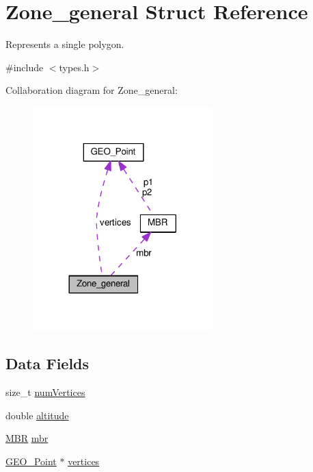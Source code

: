 \hypertarget{struct_zone__general}{}\section{Zone\+\_\+general Struct Reference}
\label{struct_zone__general}


Represents a single polygon.  




{\ttfamily \#include $<$types.\+h$>$}



Collaboration diagram for Zone\+\_\+general\+:\nopagebreak
\begin{figure}[H]
\begin{center}
\leavevmode
\includegraphics[width=197pt]{struct_zone__general__coll__graph}
\end{center}
\end{figure}
\subsection*{Data Fields}
\begin{DoxyCompactItemize}
\item 
size\+\_\+t \hyperlink{struct_zone__general_a4201b99044782c4891e04f4981f402e9}{num\+Vertices}
\item 
double \hyperlink{struct_zone__general_a2b13d276aee0d9fd646c8fa3647e869b}{altitude}
\item 
\hyperlink{struct_m_b_r}{M\+BR} \hyperlink{struct_zone__general_a5704de758d5631f53b2bb724b152f40b}{mbr}
\item 
\hyperlink{struct_g_e_o___point}{G\+E\+O\+\_\+\+Point} $\ast$ \hyperlink{struct_zone__general_acc847332c99d5cd8e044760a5c04fa1f}{vertices}
\end{DoxyCompactItemize}



